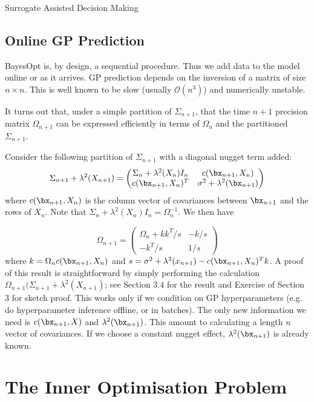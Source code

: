 \begin{chapter}{Surrogate Assisted Decision Making \label{Chap:optimisation}}
\subsection{Online GP Prediction}
 BayesOpt is, by design, a sequential procedure. Thus we add data to the model online or as it arrives. GP prediction depends on the inversion of a matrix of size $n \times n$. This is well known to be slow (usually $\mathcal{O}(n^3)$) and numerically unstable.

 It turns out that, under a simple partition of $\Sigma_{n+1}$, that the time $n+1$ precision matrix $\Omega_{n+1}$ can be expressed efficiently in terms of $\Omega_n$ and the partitioned $\Sigma_{n+1}$.

 Consider the following partition of $\Sigma_{n+1}$ with a diagonal nugget term added:
 \begin{equation}
  \Sigma_{n+1} + \lambda^2(X_{n+1}) = \begin{pmatrix}
                  \Sigma_n + \lambda^2(X_n)I_n & c(\bx_{n+1}, X_n) \\
                  c(\bx_{n+1}, X_n)^T  & \sigma^2 + \lambda^2(\bx_{n+1})
                  \end{pmatrix}
 \end{equation}
 where $c(\bx_{n+1}, X_n)$ is the column vector of covariances between $\bx_{n+1}$ and the rows of $X_n$. Note that $\Sigma_n + \lambda^2(X_n)I_n = \Omega_n ^{-1}$.
We then have

\begin{equation}
  \Omega_{n+1} = \begin{pmatrix}
                  \Omega_n + k k^T /s & -k/s \\
                  -k^T/s & 1/s
                 \end{pmatrix}
\end{equation}
where $k = \Omega_n c(\bx_{n+1}, X_n)$ and $s = \sigma^2 + \lambda^2(x_{n+1}) -  c(\bx_{n+1}, X_n)^T k$. A proof of this result is straightforward by simply performing the calculation $\Omega_{n+1} (\Sigma_{n+1} + \lambda^2(X_{n+1})$; see \citet{Gentle2007} Section $3.4$ for the result and Exercise of Section $3$ for sketch proof. This works only if we condition on GP hyperparameters (e.g. do hyperparameter inference offline, or in batches). The only new information we need is $c(\bx_{n+1}, X)$ and $\lambda^2(\bx_{n+1})$. This amount to calculating a length $n$ vector of covariances. If we choose a constant nugget effect, $\lambda^2(\bx_{n+1})$ is already known.

\section{The Inner Optimisation Problem}


\end{chapter}
